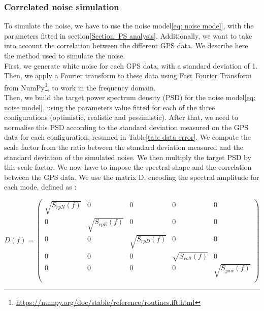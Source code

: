 \documentclass[../../thesis.tex]{subfiles}
\begin{document}
\subsubsection{Correlated noise simulation}
To simulate the noise, we have to use the noise model\ref{eq: noise model}, with the parameters fitted in section\ref{Section: PS analysis}. Additionally, we want to take into account the correlation between the different GPS data. We describe here the method used to simulate the noise. \\
First, we generate white noise for each GPS data, with a standard deviation of 1. Then, we apply a Fourier transform to these data using Fast Fourier Transform from NumPy\footnote{\url{https://numpy.org/doc/stable/reference/routines.fft.html}}, to work in the frequency domain. \\
Then, we build the target power spectrum density (PSD) for the noise model\ref{eq: noise model}, using the parameters value fitted for each of the three configurations (optimistic, realistic and pessimistic). After that, we need to normalise this PSD according to the standard deviation measured on the GPS data for each configuration, resumed in Table\ref{tab: data error}. We compute the scale factor from the ratio between the standard deviation measured and the standard deviation of the simulated noise. We then multiply the target PSD by this scale factor.
We now have to impose the spectral shape and the correlation between the GPS data. We use the matrix D, encoding the spectral amplitude for each mode, defined as :

\begin{equation}
    D(f) =
    \begin{pmatrix}
        \sqrt{S_{rpN}(f)} & 0                 & 0                 & 0                  & 0                 \\
        0                 & \sqrt{S_{rpE}(f)} & 0                 & 0                  & 0                 \\
        0                 & 0                 & \sqrt{S_{rpD}(f)} & 0                  & 0                 \\
        0                 & 0                 & 0                 & \sqrt{S_{roll}(f)} & 0                 \\
        0                 & 0                 & 0                 & 0                  & \sqrt{S_{yaw}(f)} \\
    \end{pmatrix}
\end{equation}
\end{document}
